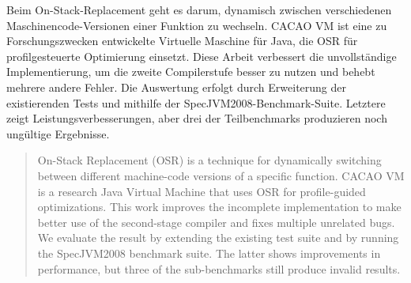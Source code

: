 \documentclass[draft,final]{vutinfth} %
\begin{document}
    \frontmatter %

    \addstatementpage



    \begin{kurzfassung}
        Beim On-Stack-Replacement geht es darum, dynamisch zwischen verschiedenen Maschinencode-Versionen einer Funktion zu wechseln.
        CACAO VM ist eine zu Forschungszwecken entwickelte Virtuelle Maschine für Java,
        die OSR für profilgesteuerte Optimierung einsetzt.
        Diese Arbeit verbessert die unvollständige Implementierung,
        um die zweite Compilerstufe besser zu nutzen
        und behebt mehrere andere Fehler.
        Die Auswertung erfolgt durch Erweiterung der existierenden Tests
        und mithilfe der SpecJVM2008-Benchmark-Suite.
        Letztere zeigt Leistungsverbesserungen,
        aber drei der Teilbenchmarks produzieren noch ungültige Ergebnisse.
    \end{kurzfassung}

    \begin{abstract}
        On-Stack Replacement (OSR) is a technique for dynamically switching between different machine-code versions of a specific function.
        CACAO VM is a research Java Virtual Machine that uses OSR for profile-guided optimizations.
        This work improves the incomplete implementation
        to make better use of the second-stage compiler
        and fixes multiple unrelated bugs.
        We evaluate the result by extending the existing test suite
        and by running the SpecJVM2008 benchmark suite.
        The latter shows improvements in performance,
        but three of the sub-benchmarks still produce invalid results.
    \end{abstract}


    \tableofcontents %
\end{document}
